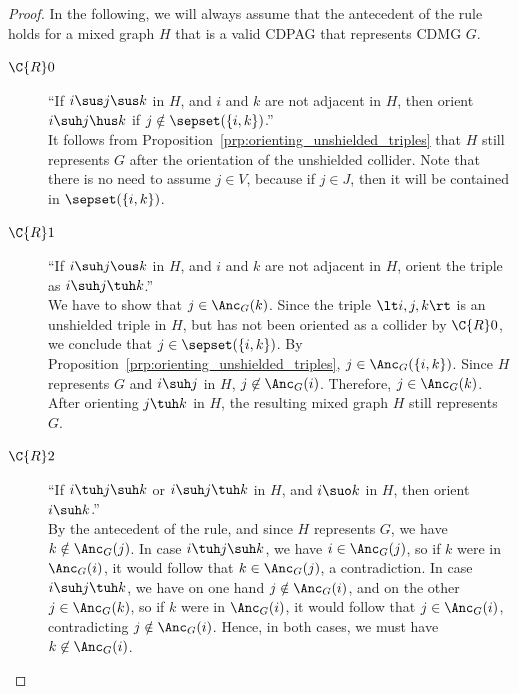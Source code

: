 \begin{proof}
  In the following, we will always assume that the antecedent of the rule holds for a mixed graph $H$ that is a valid CDPAG that represents CDMG $G$.
  \begin{description}
    \item[$\C{R}0$] ``If $i \sus j \sus k$ in $H$, and $i$ and $k$ are not adjacent in $H$, then orient $i \suh j \hus k$ if $j \notin \sepset(\{i,k\})$.''\\ %
      It follows from Proposition~\ref{prp:orienting_unshielded_triples} that $H$ still represents $G$ after the orientation of the unshielded collider.
      Note that there is no need to assume $j \in V$, because if $j \in J$, then it will be contained in $\sepset(\{i,k\})$.
    \item[$\C{R}1$] ``If $i \suh j \ous k$ in $H$, and $i$ and $k$ are not adjacent in $H$, orient the triple as $i \suh j \tuh k$.''\\
      We have to show that $j \in \Anc_G(k)$.
      Since the triple $\lt i, j, k \rt$ is an unshielded triple in $H$, but has not been oriented as a collider by $\C{R}0$, we conclude that $j \in \sepset(\{i,k\})$. %
      By Proposition~\ref{prp:orienting_unshielded_triples}, $j \in \Anc_G(\{i,k\})$.
      Since $H$ represents $G$ and $i \suh j$ in $H$, $j \not\in \Anc_G(i)$. 
      Therefore, $j \in \Anc_G(k)$.
      After orienting $j \tuh k$ in $H$, the resulting mixed graph $H$ still represents $G$.
    \item[$\C{R}2$] ``If $i \tuh j \suh k$ or $i \suh j \tuh k$ in $H$, and $i \suo k$ in $H$, then orient $i \suh k$.''\\
      By the antecedent of the rule, and since $H$ represents $G$, we have $k \notin \Anc_G(j)$.
      In case $i \tuh j \suh k$, we have $i \in \Anc_G(j)$, so if $k$ were in $\Anc_G(i)$, it would follow that $k \in \Anc_G(j)$, a contradiction.
      In case $i \suh j \tuh k$, we have on one hand $j \notin \Anc_G(i)$, and on the other $j \in \Anc_G(k)$, so if $k$ were in $\Anc_G(i)$, it would follow that $j \in \Anc_G(i)$, contradicting $j \notin \Anc_G(i)$.
      Hence, in both cases, we must have $k \not\in \Anc_G(i)$.

\end{description}
\end{proof}
